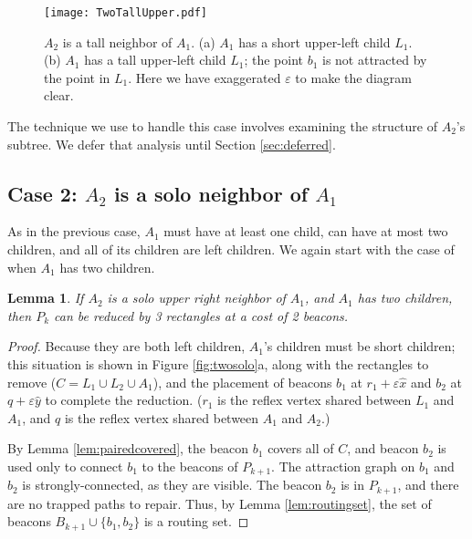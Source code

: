 \documentclass{article}
\newtheorem{lemma}{Lemma}
\begin{document}
		\begin{figure}[htbp] 
			\begin{center}
				\texttt{[image: TwoTallUpper.pdf]} 
			\end{center}
			\caption{ 
				$A_2$ is a tall neighbor of $A_1$.
				(a) $A_1$ has a short upper-left child $L_1$.
				(b) $A_1$ has a tall  upper-left child $L_1$; the point
					$b_1$ is not attracted by the point in $L_1$.
					Here we have exaggerated $\varepsilon$ to make the
					diagram clear.
			}
			\label{fig:twotallupper}
		\end{figure}
		
		The technique we use to handle this case involves examining the structure of
		$A_2$'s subtree.  We defer that analysis until
		Section \ref{sec:deferred}.


	\subsection{Case 2: $A_2$ is a solo neighbor of $A_1$}\label{sec:atwosolo}

		As in the previous case, $A_1$ must have at least one child, can have at most
		two children, and all of its children are left children.  We again start with 
		the case of when $A_1$ has two children.

		\begin{lemma}\label{lem:twosolotwo}
			If $A_2$ is a solo upper right neighbor of $A_1$, and $A_1$ has two children,
			then $P_k$ can be reduced by 3 rectangles at a cost of 2 beacons.
		\end{lemma}
		\begin{proof}
			Because they are both left children, $A_1$'s children must be short children; 
			this situation is shown in Figure
			\ref{fig:twosolo}a, along with the rectangles to remove ($C = L_1 \cup L_2 \cup A_1$), and the 
			placement of beacons $b_1$ at $r_1 + \varepsilon\hat{x}$ and $b_2$ at $q +
			\varepsilon\hat{y}$ to complete the reduction.
			($r_1$ is the reflex vertex shared between $L_1$ and $A_1$, 
			and $q$ is the reflex vertex shared between $A_1$ and $A_2$.)
			
			By Lemma \ref{lem:pairedcovered}, the beacon $b_1$ covers all of $C$, and
			beacon $b_2$ is used only to connect $b_1$ to
			the beacons of $P_{k+1}$.
			The attraction graph on $b_1$ and $b_2$ is strongly-connected,
			as they are visible.
			The beacon $b_2$ is in $P_{k+1}$, and there are no trapped paths to repair.
			Thus, by Lemma \ref{lem:routingset}, the set of beacons $B_{k+1} \cup \{ b_1,
			b_2 \}$ is a routing set.
		\end{proof}
		
\end{document}
